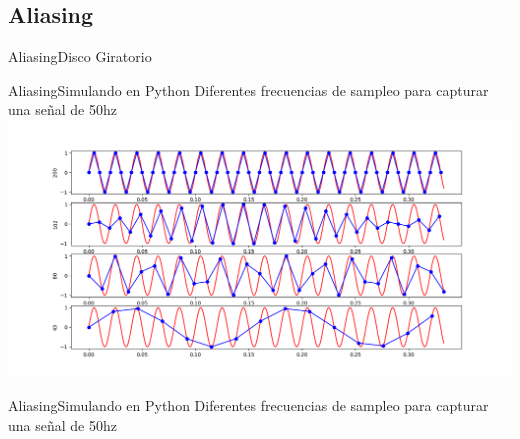  \subsection{Aliasing}
 \begin{frame}{Aliasing}{Disco Giratorio}
    \vfill
 \end{frame}
 \begin{frame}{Aliasing}{Simulando en Python}
    Diferentes frecuencias de sampleo para capturar una señal de 50hz
    \center\includegraphics[width=1.0\textwidth]{1_clase/teorema_sampleo}
    \vfill
 \end{frame}
 \begin{frame}{Aliasing}{Simulando en Python}
    \handsonicon
    Diferentes frecuencias de sampleo para capturar una señal de 50hz
    
    \vfill
 \end{frame}
